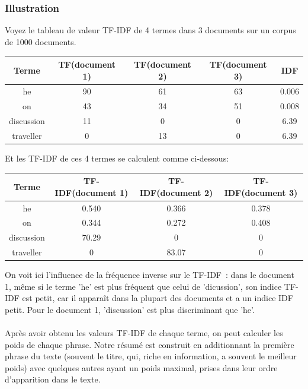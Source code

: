 \documentclass[a4paper, 12pt]{article}
\begin{document}
\subsubsection{Illustration}
Voyez le tableau de valeur TF-IDF de 4 termes dans 3 documents sur un corpus de 1000 documents.
\begin{center}
	\begin{tabular}{|c|c|c|c|c|}
	 \hline
	 	Terme & TF(document 1) & TF(document 2) & TF(document 3) & IDF \\
	 \hline
	 	he & 90 & 61 & 63 & 0.006 \\
	 \hline
	 	on & 43 & 34 & 51 & 0.008 \\
	 \hline
	 	discussion & 11 & 0 & 0 & 6.39 \\
	 \hline
	 	traveller & 0 & 13 & 0 & 6.39 \\
	 \hline
	\end{tabular}
\end{center}

Et les TF-IDF de ces 4 termes se calculent comme ci-dessous:

\begin{center}
	\begin{tabular}{|c|c|c|c|}
	 \hline
	 	Terme & TF-IDF(document 1) & TF-IDF(document 2) & TF-IDF(document 3) \\
	 \hline
	 	he & 0.540 & 0.366 & 0.378 \\
	 \hline
	 	on & 0.344 & 0.272 & 0.408 \\
	 \hline
	 	discussion & 70.29 & 0 & 0 \\
	 \hline
	 	traveller & 0 & 83.07 & 0 \\
	 \hline
	\end{tabular}
\end{center}

On voit ici l'influence de la fréquence inverse sur le TF-IDF~: dans le document 1, même si le terme 'he' est plus fréquent que celui de 'dicussion', son indice TF-IDF est petit, car il apparaît dans la plupart des documents et a un indice IDF petit. Pour le document 1, 'discussion' est plus discriminant que 'he'.

\paragraph{}
Après avoir obtenu les valeurs TF-IDF de chaque terme, on peut calculer les poids de chaque phrase. Notre résumé est construit en additionnant la première phrase du texte (souvent le titre, qui, riche en information, a souvent le meilleur poids) avec quelques autres ayant un poids maximal, prises dans leur ordre d'apparition dans le texte.
\end{document}
